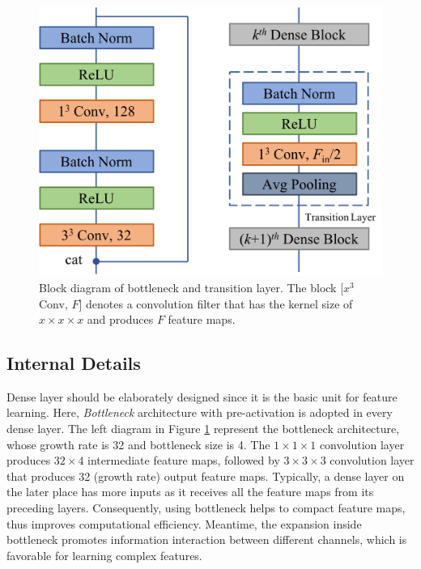 \documentclass[10pt,twocolumn,letterpaper]{article}
\begin{document}
\begin{figure}[t]
\begin{center}
\includegraphics[scale=0.32]{fig/fig2.png}
\end{center}
\caption{Block diagram of bottleneck and transition layer. The block [$x^3$ Conv, $F$] denotes a convolution filter that has the kernel size of $x \times x \times x$ and produces $F$ feature maps.}
\label{fig:bottleneck}
\end{figure}


\subsection{Internal Details}

Dense layer should be elaborately designed since it is the basic unit for feature learning. 
Here, \emph{Bottleneck} architecture with pre-activation is adopted in every dense layer. 
The left diagram in Figure \ref{fig:bottleneck} represent the bottleneck architecture, whose growth rate is 32 and bottleneck size is 4.
The $1 \times 1 \times 1$ convolution layer produces $32 \times 4$ intermediate feature maps, followed by $3 \times 3 \times 3$ convolution layer that produces 32 (growth rate) output feature maps.
Typically, a dense layer on the later place has more inputs as it receives all the feature maps from its preceding layers. 
Consequently, using bottleneck helps to compact feature maps, thus improves computational efficiency.
Meantime, the expansion inside bottleneck promotes information interaction between different channels, which is favorable for learning complex features.
\end{document}
